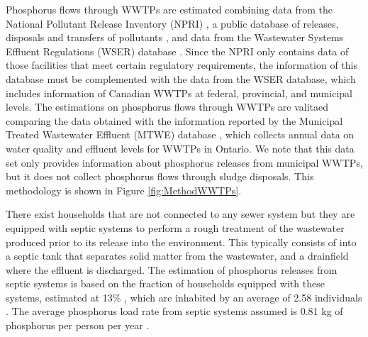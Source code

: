 \documentclass[]{elsarticle}
\begin{document}
Phosphorus flows through WWTPs are estimated combining data from the National Pollutant Release Inventory (NPRI) \citep{NPRI}, a public database of releases, disposals and transfers of pollutants
, and data from the Wastewater Systems Effluent Regulations (WSER) database \citep{WSER}. Since the NPRI only contains data of those facilities that meet certain regulatory requirements, the information of this database must be complemented with the data from the WSER database, which includes information of Canadian WWTPs at federal, provincial, and municipal levels. The estimations on phosphorus flows through WWTPs are valitaed comparing the data obtained with the information reported by the Municipal Treated Wastewater Effluent (MTWE) database \citep{MTWE}, which collects annual data on water quality and effluent levels for WWTPs in Ontario.
We note that this data set only provides information about phosphorus releases from municipal WWTPs, but it does not collect phosphorus flows through sludge disposals.
This methodology is shown in Figure \ref{fig:MethodWWTPs}.


There exist households that are not connected to any sewer system but they are equipped with septic systems to perform a rough treatment of the wastewater produced prior to its release into the environment. This typically consists of into a septic tank that separates solid matter from the wastewater, and a drainfield where the effluent is discharged. The estimation of phosphorus releases from septic systems is based on the fraction of households equipped with these systems, estimated at 13\% \citep{CanadaSepticSystems}, which are inhabited by an average of 2.58 individuals \citep{CanadaPersonPerHouse}. The average phosphorus load rate from septic systems assumed is 0.81 kg of phosphorus per person per year
\citep{oldfield2020estimation}.
\end{document}
